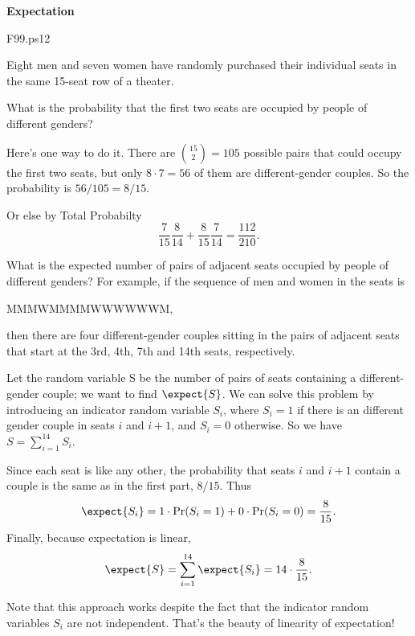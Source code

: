 \begin{problem}  \textbf{Expectation}
\begin{staffnotes}
F99.ps12
\end{staffnotes}

Eight men and seven women have randomly purchased their individual
seats in the same 15-seat row of a theater.

\bparts

\ppart What is the probability that the first two seats are occupied
by people of different genders?

\examspace[1.0in]

\begin{solution}
Here's one way to do it.  There are $\binom{15}{2} = 105$
possible pairs that could occupy the first two seats, but only $8\cdot7 =
56$ of them are different-gender couples.  So the probability is $56/105 =
8/15$.

Or else by Total Probabilty
\[
\frac{7}{15}\frac{8}{14} + \frac{8}{15}\frac{7}{14} = \frac{112}{210}.
\]
\end{solution}

\ppart What is the expected number of pairs of adjacent seats occupied
by people of different genders?  For example, if the sequence of men
and women in the seats is
\begin{center}
MMMWMMMMWWWWWWM,
\end{center}
then there are four different-gender couples sitting in the pairs of
adjacent seats that start at the 3rd, 4th, 7th and 14th seats,
respectively.

\examspace[1.4in]

\begin{solution}
Let the random variable S be the number of pairs of seats containing
a different-gender couple; we want to find $\expect{S}$.  We can solve
this problem by introducing an indicator random variable $S_i$, where
$S_i = 1$ if there is an different gender couple in seats $i$ and
$i+1$, and $S_i = 0$ otherwise.  So we have $S = \sum_{i=1}^{14} S_i$.

Since each seat is like any other, the probability that seats $i$ and
$i+1$ contain a couple is the same as in the first
part, $8/15$.  Thus
\[
\expect{S_i} = 1\cdot\Pr(S_i=1) + 0\cdot\Pr(S_i=0) = \frac{8}{15}.
\]
Finally, because expectation is linear,
\[
\expect{S} =  \sum_{i=1}^{14} \expect{S_i}  =  14\cdot \frac{8}{15}.
\]

Note that this approach works despite the fact that the indicator random
variables $S_i$ are not independent.  That's the beauty of linearity of
expectation!
\end{solution}

\eparts
\end{problem}
